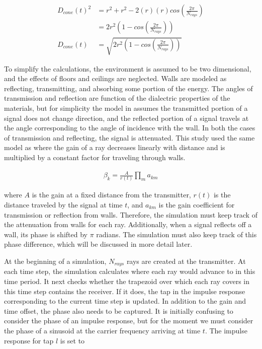 \documentclass[article,11pt,onecolumn,final]{IEEEtran}
\begin{document}
\begin{align*}
D_{cone}(t)^2 &= r^2 + r^2 - 2(r)(r)cos(\frac{2 \pi}{N_{rays}}) \\
              &= 2r^2(1 - cos(\frac{2 \pi}{N_{rays}})) \\
D_{cone}(t) &= \sqrt{2r^2(1 - cos(\frac{2 \pi}{N_{rays}}))}
\end{align*}

To simplify the calculations, the environment is assumed to be two dimensional, and the effects of floors and ceilings are neglected. Walls are modeled as reflecting, transmitting, and absorbing some portion of the energy. The angles of transmission and reflection are function of the dialectric properties of the materials, but for simplicity the model in \cite{Holt} assumes the transmitted portion of a signal does not change direction, and the reflected portion of a signal travels at the angle corresponding to the angle of incidence with the wall. In both the cases of transmission and reflecting, the signal is attenuated. This study used the same model as \cite{Holt} where the gain of a ray decreases linearly with distance and is multiplied by a constant factor for traveling through walls.

\begin{align*}
 \beta_k = \frac{A}{r(t)} \prod_m a_{km} 
\end{align*}

where $A$ is the gain at a fixed distance from the transmitter, $r(t)$ is the distance traveled by the signal at time $t$, and $a_{km}$ is the gain coefficient for transmission or reflection from walls. Therefore, the simulation must keep track of the attenuation from walls for each ray. Additionally, when a signal reflects off a wall, its phase is shifted by $\pi$ radians. The simulation must also keep track of this phase difference, which will be discussed in more detail later.

At the beginning of a simulation, $N_{rays}$ rays are created at the transmitter. At each time step, the simulation calculates where each ray would advance to in this time period. It next checks whether the trapezoid over which each ray covers in this time step contains the receiver. If it does, the tap in the impulse response corresponding to the current time step is updated. In addition to the gain and time offset, the phase also needs to be captured. It is initially confusing to consider the phase of an impulse response, but for the moment we must consider the phase of a sinusoid at the carrier frequency arriving at time $t$. The impulse response for tap $l$ is set to 
\end{document}
